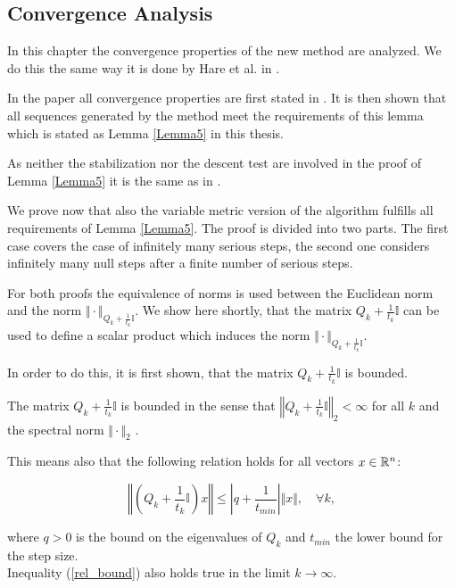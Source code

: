 \subsection{Convergence Analysis}

In this chapter the convergence properties of the new method are analyzed. We do this the same way it is done by Hare et al. in \cite{Hare2016}.

In the paper all convergence properties are first stated in \cite[Lemma 5]{Hare2016}. It is then shown that all sequences generated by the method meet the requirements of this lemma which is stated as Lemma \ref{Lemma5} in this thesis.

As neither the stabilization nor the descent test are involved in the proof of Lemma \ref{Lemma5} it is the same as in \cite{Hare2016}.

We prove now that also the variable metric version of the algorithm fulfills all requirements of Lemma \ref{Lemma5}.
The proof is divided into two parts. The first case covers the case of infinitely many serious steps, the second one considers infinitely many null steps after a finite number of serious steps.


For both proofs the equivalence of norms is used between the Euclidean norm and the norm \(\Vert \cdot \Vert_{Q_k+\frac{1}{t_k}\mathbb{I}}\).
We show here shortly, that the matrix \(Q_k+\frac{1}{t_k}\mathbb{I}\) can be used to define a scalar product which induces the norm \(\Vert \cdot \Vert_{Q_k+\frac{1}{t_k}\mathbb{I}}\).

In order to do this, it is first shown, that the matrix \(Q_k+\frac{1}{t_k}\mathbb{I}\) is bounded.

\begin{proposition}
\label{prop_bounded}
	The matrix \(Q_k+\frac{1}{t_k}\mathbb{I}\) is bounded in the sense that \(\left\Vert Q_k+\frac{1}{t_k}\mathbb{I} \right\Vert_2 < \infty \) for all \(k\) and the spectral norm \(\Vert \cdot \Vert_2\) \cite[Example 5.6.6]{Horn2012}.
	
	This means also that the following relation holds for all vectors \(x\in\mathbb{R}^n\):
	
	\begin{equation}
		\left\Vert\left(Q_k+\frac{1}{t_k}\mathbb{I}\right)x\right\Vert \leq \left\vert q + \frac{1}{t_{min}} \right\vert \Vert x\Vert , \quad \forall k,
		\label{rel_bound}
	\end{equation}
	
	where \(q > 0\) is the bound on the eigenvalues of \(Q_k\) and \(t_{min}\) the lower bound for the step size. \\
	Inequality (\ref{rel_bound}) also holds true in the limit \(k \to \infty\).
\end{proposition}

